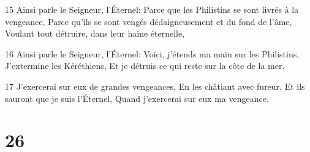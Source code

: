 \par 15 Ainsi parle le Seigneur, l'Éternel: Parce que les Philistins se sont livrés à la vengeance, Parce qu'ils se sont vengés dédaigneusement et du fond de l'âme, Voulant tout détruire, dans leur haine éternelle,
\par 16 Ainsi parle le Seigneur, l'Éternel: Voici, j'étends ma main sur les Philistins, J'extermine les Kéréthiens, Et je détruis ce qui reste sur la côte de la mer.
\par 17 J'exercerai sur eux de grandes vengeances, En les châtiant avec fureur. Et ils sauront que je suis l'Éternel, Quand j'exercerai sur eux ma vengeance.

\chapter{26}


